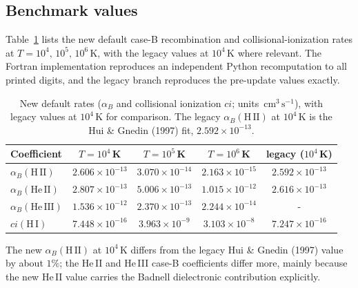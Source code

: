 \documentclass[english,a4paper]{my_memo}
\newcommand{\acm}{\ensuremath{\,\mathrm{cm^3\,s^{-1}}}}
\begin{document}
\subsection{Benchmark values}
Table~\ref{tab:bench} lists the new default case-B recombination and
collisional-ionization rates at $T=10^4,\,10^5,\,10^6$\,K, with the legacy
values at $10^4$\,K where relevant. The Fortran implementation reproduces
an independent Python recomputation to all printed digits, and the legacy
branch reproduces the pre-update values exactly.

\begin{table}[!ht]
\centering
\small
\caption{New default rates ($\alpha_B$ and collisional ionization $ci$;
units \acm{}), with legacy values at $10^4$\,K for comparison. The legacy
$\alpha_B(\mathrm{H\,II})$ at $10^4$\,K is the Hui \& Gnedin (1997) fit,
$2.592\times10^{-13}$.}
\label{tab:bench}
\begin{tabular}{@{}lcccc@{}}
\toprule
Coefficient & $T=10^4$\,K & $T=10^5$\,K & $T=10^6$\,K & legacy ($10^4$\,K)\\
\midrule
$\alpha_B(\mathrm{H\,II})$  & $2.606\times10^{-13}$ & $3.070\times10^{-14}$ & $2.163\times10^{-15}$ & $2.592\times10^{-13}$ \\
$\alpha_B(\mathrm{He\,II})$ & $2.807\times10^{-13}$ & $5.006\times10^{-13}$ & $1.015\times10^{-12}$ & $2.616\times10^{-13}$ \\
$\alpha_B(\mathrm{He\,III})$& $1.536\times10^{-12}$ & $2.370\times10^{-13}$ & $2.244\times10^{-14}$ & - \\
$ci(\mathrm{H\,I})$         & $7.448\times10^{-16}$ & $3.963\times10^{-9}$  & $3.103\times10^{-8}$  & $7.247\times10^{-16}$ \\
\bottomrule
\end{tabular}
\end{table}

The new $\alpha_B(\mathrm{H\,II})$ at $10^4$\,K differs from the legacy
Hui \& Gnedin (1997) value by about $1\%$; the He\,II and He\,III case-B
coefficients differ more, mainly because the new He\,II value carries the
Badnell dielectronic contribution explicitly.
\end{document}
